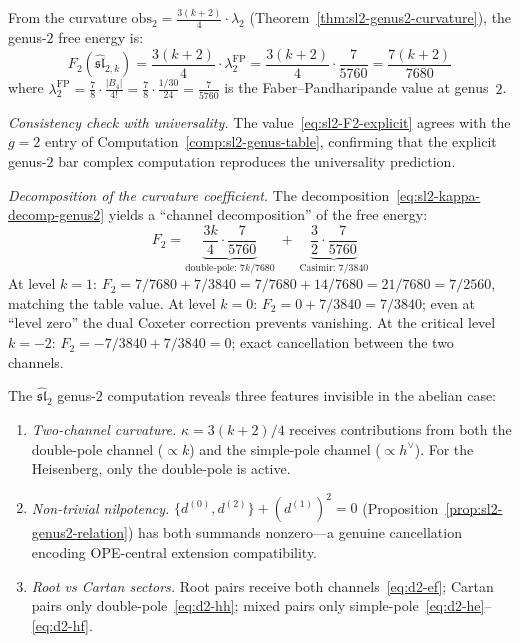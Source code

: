 \begin{computation}
\label{comp:sl2-genus2-F2}
From the curvature
$\mathrm{obs}_2 = \frac{3(k+2)}{4} \cdot \lambda_2$
(Theorem~\ref{thm:sl2-genus2-curvature}), the genus-$2$ free energy is:
\begin{equation}\label{eq:sl2-F2-explicit}
F_2(\widehat{\mathfrak{sl}}_{2,k})
= \frac{3(k+2)}{4} \cdot \lambda_2^{\mathrm{FP}}
= \frac{3(k+2)}{4} \cdot \frac{7}{5760}
= \frac{7(k+2)}{7680}
\end{equation}
where $\lambda_2^{\mathrm{FP}} = \frac{7}{8} \cdot \frac{|B_4|}{4!}
= \frac{7}{8} \cdot \frac{1/30}{24} = \frac{7}{5760}$
is the Faber--Pandharipande value at genus~$2$.

\emph{Consistency check with universality.}
The value~\eqref{eq:sl2-F2-explicit} agrees with the $g = 2$ entry
of Computation~\ref{comp:sl2-genus-table}, confirming that the
explicit genus-$2$ bar complex computation reproduces the
universality prediction.

\emph{Decomposition of the curvature coefficient.}
The decomposition~\eqref{eq:sl2-kappa-decomp-genus2} yields a
``channel decomposition'' of the free energy:
\[
F_2 = \underbrace{\frac{3k}{4} \cdot \frac{7}{5760}}_{\text{double-pole: } 7k/7680}
\;+\; \underbrace{\frac{3}{2} \cdot \frac{7}{5760}}_{\text{Casimir: } 7/3840}
\]
At level $k = 1$: $F_2 = 7/7680 + 7/3840 = 7/7680 + 14/7680 = 21/7680 = 7/2560$,
matching the table value.
At level $k = 0$: $F_2 = 0 + 7/3840 = 7/3840$; even at ``level zero'' the
dual Coxeter correction prevents vanishing.
At the critical level $k = -2$: $F_2 = -7/3840 + 7/3840 = 0$; exact
cancellation between the two channels.
\end{computation}

\begin{remark}\label{rem:sl2-genus2-nonabelian}
The $\widehat{\mathfrak{sl}}_2$ genus-$2$ computation reveals three features invisible in the abelian case:
\begin{enumerate}
\item \emph{Two-channel curvature.}  $\kappa = 3(k+2)/4$ receives contributions from both the double-pole channel ($\propto k$) and the simple-pole channel ($\propto h^\vee$).  For the Heisenberg, only the double-pole is active.
\item \emph{Non-trivial nilpotency.}  $\{d^{(0)}, d^{(2)}\} + (d^{(1)})^2 = 0$ (Proposition~\ref{prop:sl2-genus2-relation}) has both summands nonzero---a genuine cancellation encoding OPE-central extension compatibility.
\item \emph{Root vs Cartan sectors.}  Root pairs receive both channels~\eqref{eq:d2-ef}; Cartan pairs only double-pole~\eqref{eq:d2-hh}; mixed pairs only simple-pole~\eqref{eq:d2-he}--\eqref{eq:d2-hf}.
\end{enumerate}
\end{remark}

